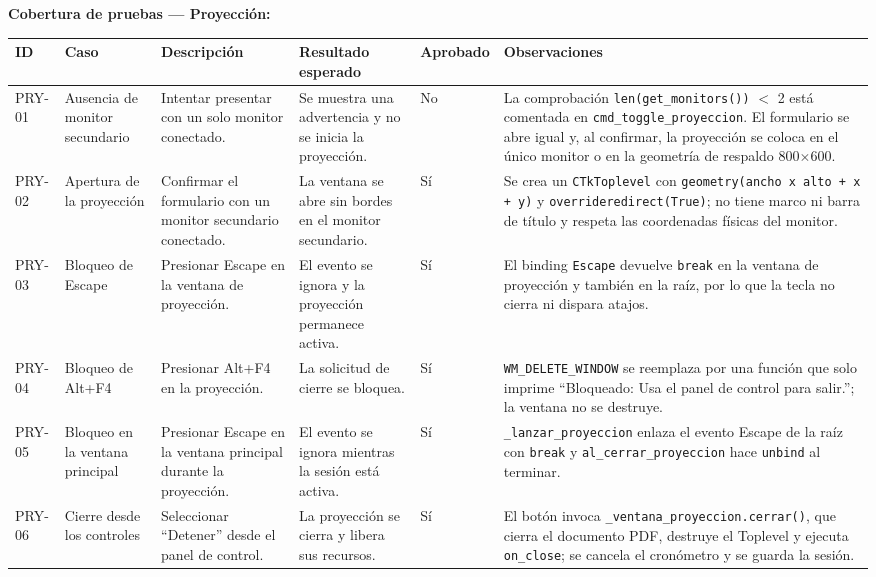 \documentclass[12pt,letterpaper]{article}
\begin{document}
\textbf{Cobertura de pruebas --- Proyección:}

{\tiny
\renewcommand{\arraystretch}{1.15}
\begin{longtable}{|L{1.1cm}|L{2.3cm}|L{3.2cm}|L{3.6cm}|L{1.2cm}|L{3.6cm}|}
\hline
\textbf{ID} & \textbf{Caso} & \textbf{Descripción} & \textbf{Resultado esperado} & \textbf{Aprobado} & \textbf{Observaciones} \\ \hline
\endhead
PRY-01 & Ausencia de monitor secundario & Intentar presentar con un solo monitor conectado. & Se muestra una advertencia y no se inicia la proyección. & No & La comprobación \texttt{len(get\_monitors())} $<$ 2 está comentada en \texttt{cmd\_toggle\_proyeccion}. El formulario se abre igual y, al confirmar, la proyección se coloca en el único monitor o en la geometría de respaldo 800$\times$600. \\ \hline
PRY-02 & Apertura de la proyección & Confirmar el formulario con un monitor secundario conectado. & La ventana se abre sin bordes en el monitor secundario. & Sí & Se crea un \texttt{CTkToplevel} con \texttt{geometry(ancho x alto + x + y)} y \texttt{overrideredirect(True)}; no tiene marco ni barra de título y respeta las coordenadas físicas del monitor. \\ \hline
PRY-03 & Bloqueo de Escape & Presionar Escape en la ventana de proyección. & El evento se ignora y la proyección permanece activa. & Sí & El binding \texttt{Escape} devuelve \texttt{break} en la ventana de proyección y también en la raíz, por lo que la tecla no cierra ni dispara atajos. \\ \hline
PRY-04 & Bloqueo de Alt+F4 & Presionar Alt+F4 en la proyección. & La solicitud de cierre se bloquea. & Sí & \texttt{WM\_DELETE\_WINDOW} se reemplaza por una función que solo imprime ``Bloqueado: Usa el panel de control para salir.''; la ventana no se destruye. \\ \hline
PRY-05 & Bloqueo en la ventana principal & Presionar Escape en la ventana principal durante la proyección. & El evento se ignora mientras la sesión está activa. & Sí & \texttt{\_lanzar\_proyeccion} enlaza el evento Escape de la raíz con \texttt{break} y \texttt{al\_cerrar\_proyeccion} hace \texttt{unbind} al terminar. \\ \hline
PRY-06 & Cierre desde los controles & Seleccionar ``Detener'' desde el panel de control. & La proyección se cierra y libera sus recursos. & Sí & El botón invoca \texttt{\_ventana\_proyeccion.cerrar()}, que cierra el documento PDF, destruye el Toplevel y ejecuta \texttt{on\_close}; se cancela el cronómetro y se guarda la sesión. \\ \hline

\end{longtable}}
\end{document}

